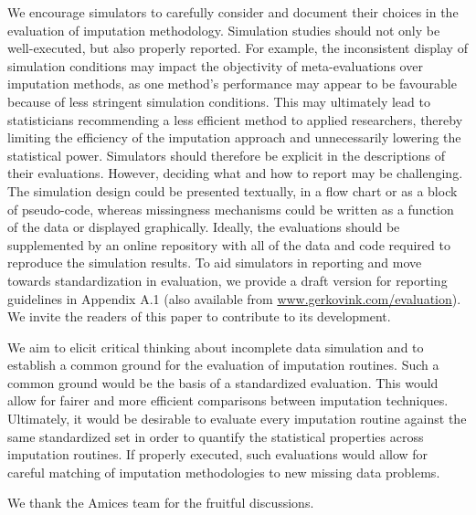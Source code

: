 \documentclass[bimj,fleqn]{w-art}
\begin{document}
We encourage simulators to carefully consider and document their choices in the evaluation of imputation methodology. Simulation studies should not only be well-executed, but also properly reported. For example, the inconsistent display of simulation conditions may impact the objectivity of meta-evaluations over imputation methods, as one method's performance may appear to be favourable because of less stringent simulation conditions. This may ultimately lead to statisticians recommending a less efficient method to applied researchers, thereby limiting the efficiency of the imputation approach and unnecessarily lowering the statistical power. Simulators should therefore be explicit in the descriptions of their evaluations. However, deciding what and how to report may be challenging. The simulation design could be presented textually, in a flow chart or as a block of pseudo-code, whereas missingness mechanisms could be written as a function of the data or displayed graphically. Ideally, the evaluations should be supplemented by an online repository with all of the data and code required to reproduce the simulation results. To aid simulators in reporting and move towards standardization in evaluation, we provide a draft version for reporting guidelines in Appendix A.1 (also available from \underline{www.gerkovink.com/evaluation}). We invite the readers of this paper to contribute to its development. 

We aim to elicit critical thinking about incomplete data simulation and to establish a common ground for the evaluation of imputation routines. Such a common ground would be the basis of a standardized evaluation. This would allow for fairer and more efficient comparisons between imputation techniques. Ultimately, it would be desirable to evaluate every imputation routine against the same standardized set in order to quantify the statistical properties across imputation routines. If properly executed, such evaluations would allow for careful matching of imputation methodologies to new missing data problems. 



\begin{acknowledgement}
We thank the Amices team for the fruitful discussions.
\end{acknowledgement}
\vspace*{1pc}


\end{document}
